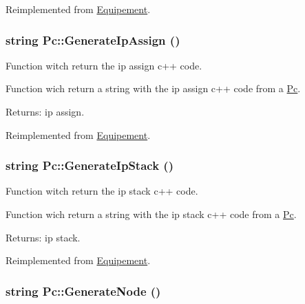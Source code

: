 Reimplemented from \hyperlink{class_equipement_8d24220539ff36aeb021daaec32f729e}{Equipement}.\hypertarget{class_pc_b743fd5f5d74f1d5db9549aa43fab9c5}{
\subsubsection[{GenerateIpAssign}]{\setlength{\rightskip}{0pt plus 5cm}string Pc::GenerateIpAssign ()}}
\label{class_pc_b743fd5f5d74f1d5db9549aa43fab9c5}


Function witch return the ip assign c++ code. 

Function wich return a string with the ip assign c++ code from a \hyperlink{class_pc}{Pc}.

\begin{Desc}
\item[Returns:]ip assign. \end{Desc}


Reimplemented from \hyperlink{class_equipement_d1e684114ebf6746f77cc370cdb449e5}{Equipement}.\hypertarget{class_pc_205240ed7c68ad780ff4a669376c04eb}{
\subsubsection[{GenerateIpStack}]{\setlength{\rightskip}{0pt plus 5cm}string Pc::GenerateIpStack ()}}
\label{class_pc_205240ed7c68ad780ff4a669376c04eb}


Function witch return the ip stack c++ code. 

Function wich return a string with the ip stack c++ code from a \hyperlink{class_pc}{Pc}.

\begin{Desc}
\item[Returns:]ip stack. \end{Desc}


Reimplemented from \hyperlink{class_equipement_37fe31be30e3ea66fe6bdaab9d66bc15}{Equipement}.\hypertarget{class_pc_e72f59f25f046967f021e56a90281d77}{
\subsubsection[{GenerateNode}]{\setlength{\rightskip}{0pt plus 5cm}string Pc::GenerateNode ()}}
\label{class_pc_e72f59f25f046967f021e56a90281d77}


